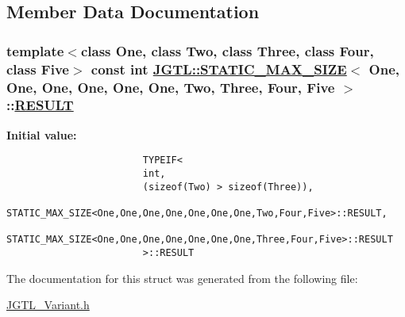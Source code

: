 \subsection{Member Data Documentation}
\hypertarget{struct_j_g_t_l_1_1_s_t_a_t_i_c___m_a_x___s_i_z_e_3_01_one_00_01_one_00_01_one_00_01_one_00_01_on2fb88e04d0121b9aa29a50f9670e334c_2b45c44d4066a2069386f1f4f5653095}{
\subsubsection[RESULT]{\setlength{\rightskip}{0pt plus 5cm}template$<$class One, class Two, class Three, class Four, class Five$>$ const int \hyperlink{struct_j_g_t_l_1_1_s_t_a_t_i_c___m_a_x___s_i_z_e}{JGTL::STATIC\_\-MAX\_\-SIZE}$<$ One, One, One, One, One, One, Two, Three, Four, Five $>$::\hyperlink{struct_j_g_t_l_1_1_s_t_a_t_i_c___m_a_x___s_i_z_e_3_01_one_00_01_one_00_01_one_00_01_one_00_01_on2fb88e04d0121b9aa29a50f9670e334c_2b45c44d4066a2069386f1f4f5653095}{RESULT}}}
\label{struct_j_g_t_l_1_1_s_t_a_t_i_c___m_a_x___s_i_z_e_3_01_one_00_01_one_00_01_one_00_01_one_00_01_on2fb88e04d0121b9aa29a50f9670e334c_2b45c44d4066a2069386f1f4f5653095}


\textbf{Initial value:}

\begin{Code}\begin{verbatim}
                        TYPEIF<
                        int,
                        (sizeof(Two) > sizeof(Three)),
                        STATIC_MAX_SIZE<One,One,One,One,One,One,One,Two,Four,Five>::RESULT,
                        STATIC_MAX_SIZE<One,One,One,One,One,One,One,Three,Four,Five>::RESULT
                        >::RESULT
\end{verbatim}\end{Code}


The documentation for this struct was generated from the following file:\begin{CompactItemize}
\item 
\hyperlink{_j_g_t_l___variant_8h}{JGTL\_\-Variant.h}\end{CompactItemize}
